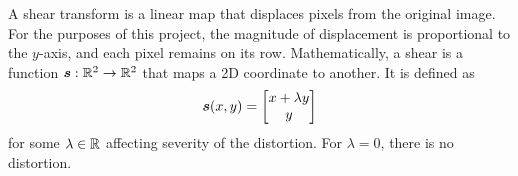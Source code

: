 \documentclass[../report.tex]{subfiles}
\begin{document}
A shear transform is a linear map that displaces pixels from the original image. 
For the purposes of this project, the magnitude of displacement is proportional to the $y$-axis, and each pixel remains on its row.
Mathematically, a shear is a function ${\bm{s}} : \mathbb{R}^2 \to \mathbb{R}^2$ that maps a 2D coordinate to another.
It is defined as
\begin{equation}
    {\bm{s}}(x,y) = \begin{bmatrix}
        x + \lambda y \\ y
    \end{bmatrix}
\end{equation}
for some $\lambda \in \mathbb{R}$ affecting severity of the distortion.
For $\lambda=0$, there is no distortion.
\begin{figure}
    \centering
    \begin{subfigure}[b]{0.47\textwidth}
\end{subfigure}
\end{figure}
\end{document}
